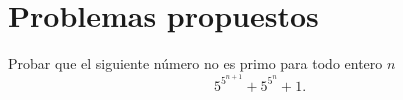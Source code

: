 \section*{\large Problemas propuestos}

\begin{problem}
Probar que el siguiente número no es primo para todo entero $n$ $$5^{5^{n+1}} + 5^{5^n} + 1.$$
\end{problem}
